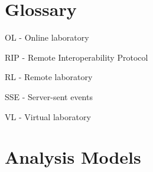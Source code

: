 \begin{appendices}

\chapter{Glossary}
OL - Online laboratory

RIP - Remote Interoperability Protocol

RL - Remote laboratory

SSE - Server-sent events

VL - Virtual laboratory


\chapter{Analysis Models}

\end{appendices}
